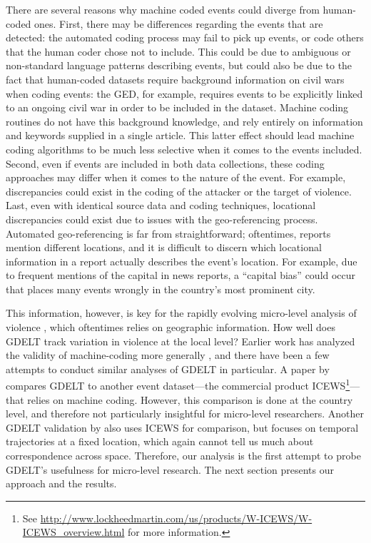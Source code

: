 \documentclass[hidelinks]{article}
\begin{document}
There are several reasons why machine coded events could diverge from human-coded ones. First, there may be differences regarding the events that are detected: the automated coding process may fail to pick up events, or code others that the human coder chose not to include. This could be due to ambiguous or non-standard language patterns describing events, but could also be due to the fact that human-coded datasets require background information on civil wars when coding events: the GED, for example, requires events to be explicitly linked to an ongoing civil war in order to be included in the dataset. Machine coding routines do not have this background knowledge, and rely entirely on information and keywords supplied in a single article. This latter effect should lead machine coding algorithms to be much less selective when it comes to the events included. Second, even if events are included in both data collections, these coding approaches may differ when it comes to the nature of the event. For example, discrepancies could exist in the coding of the attacker or the target of violence. Last, even with identical source data and coding techniques, locational discrepancies could exist due to issues with the geo-referencing process. Automated geo-referencing is far from straightforward; oftentimes, reports mention different locations, and it is difficult to discern which locational information in a report actually describes the event's location. For example, due to frequent mentions of the capital in news reports, a ``capital bias'' could occur that places many events wrongly in the country's most prominent city. 

This information, however, is key for the rapidly evolving micro-level analysis of violence \citep{kalyvas12micro}, which oftentimes relies on geographic information. How well does GDELT track variation in violence at the local level? Earlier work has analyzed the validity of machine-coding more generally \citep{schrodt94validity}, and there have been a few attempts to conduct similar analyses of GDELT in particular. A paper by \citet{arva13improving} compares GDELT to another event dataset---the commercial product ICEWS\footnote{See \url{http://www.lockheedmartin.com/us/products/W-ICEWS/W-ICEWS_overview.html} for more information.}---that relies on machine coding. However, this comparison is done at the country level, and therefore not particularly insightful for micro-level researchers. Another GDELT validation by \citet{ward13comparing} also uses ICEWS for comparison, but focuses on temporal trajectories at a fixed location, which again cannot tell us much about correspondence across space. Therefore, our analysis is the first attempt to probe GDELT's usefulness for micro-level research. The next section presents our approach and the results.
\end{document}
